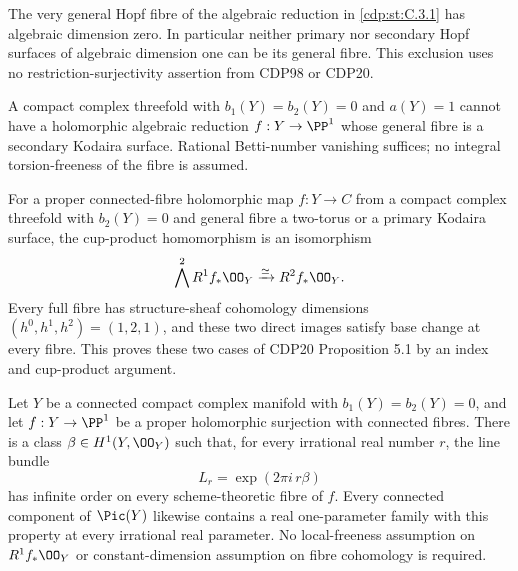 \begin{proposition}\hypertarget{tag-01FE}{}\label{cdp:st:C.3.8}



The very general Hopf fibre of the algebraic reduction in \ref{cdp:st:C.3.1}
has algebraic dimension zero. In particular neither primary nor
secondary Hopf surfaces of algebraic dimension one can be its
general fibre. This exclusion uses no restriction-surjectivity
assertion from CDP98 or CDP20.
\end{proposition}

\begin{proposition}\hypertarget{tag-01FF}{}\label{cdp:st:C.3.9}



A compact complex threefold with $b_1(Y)=b_2(Y)=0$ and
$a(Y)=1$ cannot have a holomorphic algebraic reduction
$f:Y\to\PP^1$ whose general fibre is a secondary Kodaira
surface. Rational Betti-number vanishing suffices; no integral
torsion-freeness of the fibre is assumed.
\end{proposition}

\begin{proposition}\hypertarget{tag-01FX}{}\label{cdp:st:D.1.12}


For a proper connected-fibre holomorphic map $f:Y\to C$ from a
compact complex threefold with $b_2(Y)=0$ and general fibre a
two-torus or a primary Kodaira surface, the cup-product homomorphism
is an isomorphism
\[
\bigwedge^2R^1f_*\OO_Y\xrightarrow{\simeq}R^2f_*\OO_Y.
\]
Every full fibre has structure-sheaf cohomology dimensions
$(h^0,h^1,h^2)=(1,2,1)$, and these two direct images satisfy
base change at every fibre. This proves these two cases of CDP20
Proposition 5.1 by an index and cup-product argument.
\end{proposition}

\begin{proposition}\hypertarget{tag-01G7}{}\label{cdp:st:D.1.9}


Let $Y$ be a connected compact complex manifold with
$b_1(Y)=b_2(Y)=0$, and let $f:Y\to\PP^1$ be a proper
holomorphic surjection with connected fibres. There is a class
$\beta\in H^1(Y,\OO_Y)$ such that, for every irrational real number
$r$, the line bundle
\[
L_r=\exp(2\pi i\,r\beta)
\]
has infinite order on every scheme-theoretic fibre of $f$.
Every connected component of $\Pic(Y)$ likewise contains a real
one-parameter family with this property at every irrational real
parameter.
No local-freeness assumption on $R^1f_*\OO_Y$ or constant-dimension
assumption on fibre cohomology is required.
\end{proposition}

